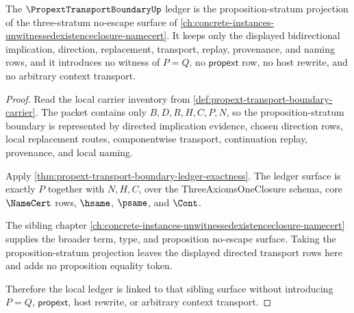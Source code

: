 \begin{theorem}
\label{thm:propext-transport-boundary-three-axioms-sibling-link}
The $\PropextTransportBoundaryUp$ ledger is the proposition-stratum projection
of the three-stratum no-escape surface of
\autoref{ch:concrete-instances-unwitnessedexistenceclosure-namecert}. It
keeps only the displayed bidirectional implication, direction, replacement,
transport, replay, provenance, and naming rows, and it introduces no witness
of $P=Q$, no $\mathsf{propext}$ row, no host rewrite, and no arbitrary
context transport.
\end{theorem}
\begin{proof}
Read the local carrier inventory from
\autoref{def:propext-transport-boundary-carrier}. The packet contains only
$B,D,R,H,C,P,N$, so the proposition-stratum boundary is represented by
directed implication evidence, chosen direction rows, local replacement
routes, componentwise transport, continuation replay, provenance, and local
naming.

Apply \autoref{thm:propext-transport-boundary-ledger-exactness}. The ledger
surface is exactly $P$ together with $N,H,C$, over the ThreeAxiomsOneClosure
schema, core $\NameCert$ rows, $\hsame$, $\psame$, and $\Cont$.

The sibling chapter
\autoref{ch:concrete-instances-unwitnessedexistenceclosure-namecert} supplies
the broader term, type, and proposition no-escape surface. Taking the
proposition-stratum projection leaves the displayed directed transport rows
here and adds no proposition equality token.

Therefore the local ledger is linked to that sibling surface without
introducing $P=Q$, $\mathsf{propext}$, host rewrite, or arbitrary context
transport.
\end{proof}


